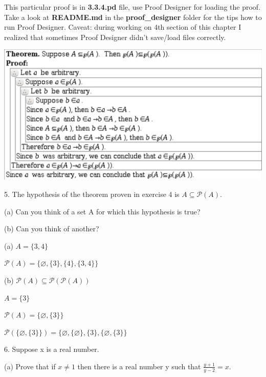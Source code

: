 \documentclass{article}
\begin{document}
This particular proof is in \textbf{3.3.4.pd} file, use Proof Designer for loading the proof. Take a look at \textbf{README.md} in the \textbf{proof\_designer} folder for the tips how to run Proof Designer.
Caveat: during working on 4th section of this chapter I realized that sometimes Proof Designer didn't save/load files correctly. 
\vspace{10pt}
 
\includegraphics[width=\textwidth]{3_3_4}

\vspace{30pt}

5. The hypothesis of the theorem proven in exercise 4 is $A \subseteq \mathcal{P} (A)$.

\hspace{12pt}(a) Can you think of a set A for which this hypothesis is true?

\hspace{12pt}(b) Can you think of another?
\vspace{30pt}

(a) $A = \{3, 4\}$

$\mathcal{P} (A) = \{\varnothing, \{3\}, \{4\}, \{3, 4\}\}$

\vspace{20pt}

(b) $\mathcal{P} (A) \subseteq \mathcal{P} (\mathcal{P} (A))$

$A = \{3\}$

$\mathcal{P} (A) = \{\varnothing, \{3\}\}$

$\mathcal{P} (\{\varnothing, \{3\}\}) = \{\varnothing, \{\varnothing\}, \{3\}, \{\varnothing, \{3\}\}$

\vspace{30pt}

6. Suppose x is a real number.

\hspace{12pt}(a) Prove that if $x \neq 1$ then there is a real number y such that $\frac{y+1}{y-2} = x$.
\end{document}
